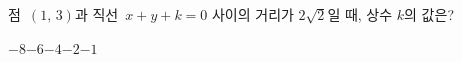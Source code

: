 점~$(1,\,3)$과 직선~$x+y+k=0$ 사이의 거리가 $2\sqrt{2}$일 때, 상수 $k$의 값은? 
\begin{choices32}{$-8$}{$-6$}{$-4$}{$-2$}{$-1$}\end{choices32}
